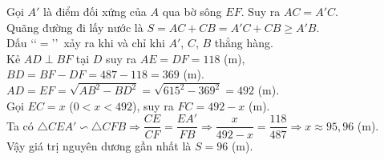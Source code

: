 \begin{bt}
{	Gọi $A'$ là điểm đối xứng của $A$ qua bờ sông $EF$. Suy ra $AC=A'C$.\\
	Quãng đường đi lấy nước là $S=AC+CB=A'C+CB\geqslant A'B$.\\
	Dấu \lq\lq$=$\rq\rq\ xảy ra khi và chỉ khi $A'$, $C$, $B$ thẳng hàng.\\
	Kẻ $AD\perp BF$ tại $D$ suy ra $AE=DF=118$ (m), $BD=BF-DF=487-118=369$ (m). $AD=EF=\sqrt{AB^2-BD^2}=\sqrt{615^2-369^2}=492$ (m).\\
	Gọi $EC=x$ ($0<x<492$), suy ra $FC=492-x$ (m).\\
	Ta có $\triangle CEA'\backsim \triangle CFB\Rightarrow \dfrac{CE}{CF}=\dfrac{EA'}{FB}\Rightarrow\dfrac{x}{492-x}=\dfrac{118}{487}\Rightarrow x\approx 95{,}96$ (m).\\
	Vậy giá trị nguyên dương gần nhất là $S=96$ (m).
}
\end{bt}

